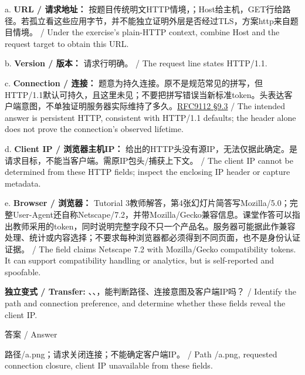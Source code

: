 a. \textbf{URL / 请求地址：} 按题目传统明文HTTP情境，；Host给主机，GET行给路径。若孤立看这些应用字节，并不能独立证明外层是否经过TLS，方案http来自题目情境。 / Under the exercise's plain-HTTP context, combine Host and the request target to obtain this URL.


b. \textbf{Version / 版本：} 请求行明确。 / The request line states HTTP/1.1.


c. \textbf{Connection / 连接：} 题意为持久连接。原不是规范常见的拼写，但HTTP/1.1默认可持久，且这里未见；不要把拼写错误当新标准token。头表达客户端意图，不单独证明服务器实际维持了多久。\href{https://www.rfc-editor.org/rfc/rfc9112}{RFC9112 §9.3} / The intended answer is persistent HTTP, consistent with HTTP/1.1 defaults; the header alone does not prove the connection's observed lifetime.


d. \textbf{Client IP / 浏览器主机IP：} 给出的HTTP头没有源IP，无法仅据此确定。是请求目标，不能当客户端。需原IP包头/捕获上下文。 / The client IP cannot be determined from these HTTP fields; inspect the enclosing IP header or capture metadata.


e. \textbf{Browser / 浏览器：} Tutorial 3教师解答，第4张幻灯片简答写Mozilla/5.0；完整User-Agent还自称Netscape/7.2，并带Mozilla/Gecko兼容信息。课堂作答可以指出教师采用的token，同时说明完整字段不只一个产品名。服务器可能据此作兼容处理、统计或内容选择；不要求每种浏览器都必须得到不同页面，也不是身份认证证据。 / The field claims Netscape 7.2 with Mozilla/Gecko compatibility tokens. It can support compatibility handling or analytics, but is self-reported and spoofable.


\textbf{独立变式 / Transfer:} 、、，能判断路径、连接意图及客户端IP吗？ / Identify the path and connection preference, and determine whether these fields reveal the client IP.



\begin{StudySolution}{答案 / Answer}


路径/a.png；请求关闭连接；不能确定客户端IP。 / Path /a.png, requested connection closure, client IP unavailable from these fields.


\end{StudySolution}






